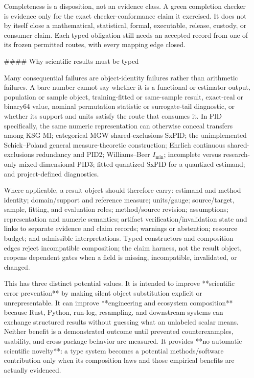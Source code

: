 \documentclass[11pt]{article}
\begin{document}
\begin{markdown}
Completeness is a disposition, not an evidence class. A green completion checker is evidence only
for the exact checker-conformance claim it exercised. It does not by itself close a mathematical,
statistical, formal, executable, release, custody, or consumer claim. Each typed obligation still
needs an accepted record from one of its frozen permitted routes, with every mapping edge closed.

#### Why scientific results must be typed

Many consequential failures are object-identity failures rather than arithmetic failures. A bare
number cannot say whether it is a functional or estimator output, population or sample object,
training-fitted or same-sample result, exact-real or binary64 value, nominal permutation statistic
or surrogate-tail diagnostic, or whether its support and units satisfy the route that consumes it.
In PID specifically, the same numeric representation can otherwise conceal transfers among KSG
MI; categorical MGW shared-exclusions SxPID; the unimplemented Schick--Poland general
measure-theoretic construction; Ehrlich continuous shared-exclusions redundancy and PID2;
Williams--Beer $I_{\min}$; incomplete versus research-only mixed-dimensional PID3; fitted
quantized SxPID for a quantized estimand; and project-defined diagnostics.

Where applicable, a result object should therefore carry: estimand and method identity;
domain/support and reference measure; units/gauge; source/target, sample, fitting, and evaluation
roles; method/source revision; assumptions; representation and numeric semantics; artifact
verification/invalidation state and links to separate evidence and claim records; warnings or
abstention; resource budget; and admissible interpretations. Typed constructors and composition
edges reject incompatible composition; the claim harness, not the result object, reopens dependent
gates when a field is missing, incompatible, invalidated, or changed.

This has three distinct potential values. It is intended to improve **scientific error prevention**
by making silent object substitution explicit or unrepresentable. It can improve **engineering and
ecosystem composition** because Rust, Python, run-log, resampling, and downstream systems can
exchange structured results without guessing what an unlabeled scalar means. Neither benefit is a
demonstrated outcome until prevented counterexamples, usability, and cross-package behavior are
measured. It provides **no automatic scientific novelty**: a type system becomes a potential
methods/software contribution only when its composition laws and those empirical benefits are
actually evidenced.


\end{markdown}
\end{document}
